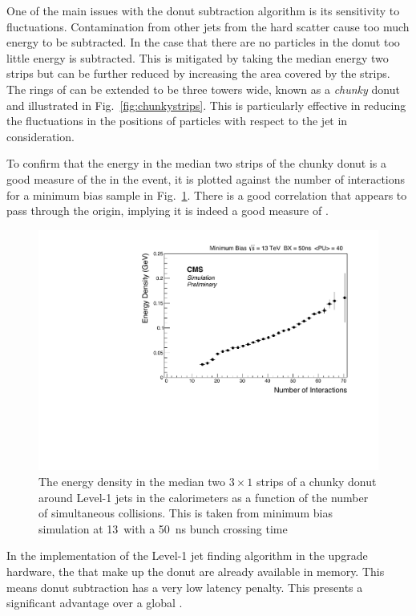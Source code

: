 One of the main issues with the donut subtraction algorithm is its
sensitivity to fluctuations. Contamination from other jets from the
hard scatter cause too much energy to be subtracted. In the case
that there are no \PU particles in the donut too little energy is
subtracted. This is mitigated by taking the median energy two strips
but can be further reduced by increasing the area covered by the
strips. The rings of \TTs can be extended to be three towers wide,
known as a \emph{chunky} donut and illustrated in
Fig.~\ref{fig:chunkystrips}. This is particularly effective in
reducing the fluctuations in the positions of \PU particles with
respect to the jet in consideration.

To confirm that the energy in the median two strips of the  chunky
donut is a good measure of the \PU in the event, it is plotted against
the number of interactions for a minimum bias \MC sample in
Fig.~\ref{fig:donut_nint}. There is a good correlation that appears to
pass through the origin, implying it is indeed a good measure of \PU. 

\begin{figure}
	\begin{center}
		\includegraphics[width=0.8\linewidth]{figs/trigger/threestrips}
  \caption{The energy density in the median two $3\times 1$ \TT strips
  of a chunky donut around Level-1 jets in the \CMS calorimeters as a
  function of the number of simultaneous collisions. This is taken
  from minimum bias \MC simulation at 13~\tev with a 50~ns bunch
  crossing time}
	\label{fig:donut_nint}
	\end{center}
\end{figure}

In the implementation of the Level-1 jet finding algorithm in the
upgrade hardware, the \TTs that make up the donut are already
available in memory. This means donut subtraction has a very low
latency penalty. This presents a significant advantage over a global
\PUS. 

